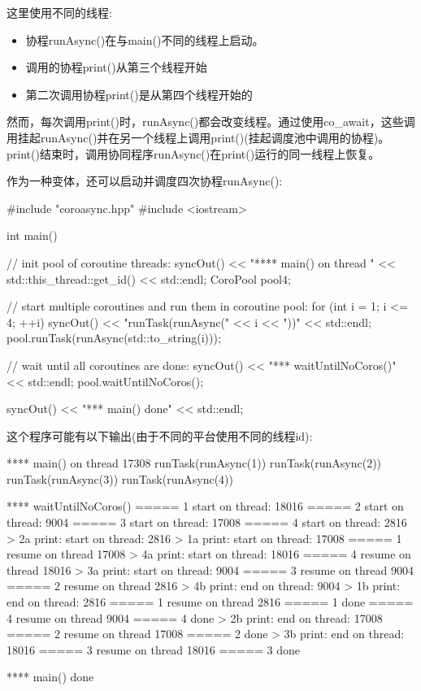 这里使用不同的线程:

\begin{itemize}
\item
协程runAsync()在与main()不同的线程上启动。

\item
调用的协程print()从第三个线程开始

\item
第二次调用协程print()是从第四个线程开始的
\end{itemize}

然而，每次调用print()时，runAsync()都会改变线程。通过使用co\_await，这些调用挂起runAsync()并在另一个线程上调用print()(挂起调度池中调用的协程)。print()结束时，调用协同程序runAsync()在print()运行的同一线程上恢复。

作为一种变体，还可以启动并调度四次协程runAsync():


\begin{cpp}
#include "coroasync.hpp"
#include <iostream>

int main()
{
	// init pool of coroutine threads:
	syncOut() << "**** main() on thread " << std::this_thread::get_id()
			  << std::endl;
	CoroPool pool{4};

	// start multiple coroutines and run them in coroutine pool:
	for (int i = 1; i <= 4; ++i) {
		syncOut() << "runTask(runAsync(" << i << "))" << std::endl;
		pool.runTask(runAsync(std::to_string(i)));
	}

	// wait until all coroutines are done:
	syncOut() << "\n**** waitUntilNoCoros()" << std::endl;
	pool.waitUntilNoCoros();

	syncOut() << "\n**** main() done" << std::endl;
}
\end{cpp}

这个程序可能有以下输出(由于不同的平台使用不同的线程id):

\begin{shell}
**** main() on thread 17308
runTask(runAsync(1))
runTask(runAsync(2))
runTask(runAsync(3))
runTask(runAsync(4))

**** waitUntilNoCoros()
===== 1 start on thread: 18016
===== 2 start on thread: 9004
===== 3 start on thread: 17008
===== 4 start on thread: 2816
    > 2a print: start on thread: 2816
    > 1a print: start on thread: 17008
===== 1 resume on thread 17008
    > 4a print: start on thread: 18016
===== 4 resume on thread 18016
    > 3a print: start on thread: 9004
===== 3 resume on thread 9004
===== 2 resume on thread 2816
    > 4b print: end on thread: 9004
    > 1b print: end on thread: 2816
===== 1 resume on thread 2816
===== 1 done
===== 4 resume on thread 9004
===== 4 done
    > 2b print: end on thread: 17008
===== 2 resume on thread 17008
===== 2 done
    > 3b print: end on thread: 18016
===== 3 resume on thread 18016
===== 3 done

**** main() done
\end{shell}


